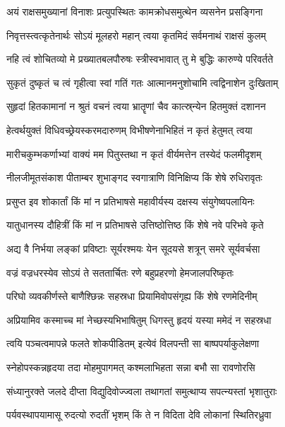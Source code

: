 \twolineshloka
{अयं राक्षसमुख्यानां विनाशः प्रत्युपस्थितः}
{कामक्रोधसमुत्थेन व्यसनेन प्रसङ्गिना} %

\twolineshloka
{निवृत्तस्त्वत्कृतेनार्थः सोऽयं मूलहरो महान्}
{त्वया कृतमिदं सर्वमनाथं राक्षसं कुलम्} %

\twolineshloka
{नहि त्वं शोचितव्यो मे प्रख्यातबलपौरुषः}
{स्त्रीस्वभावात् तु मे बुद्धिः कारुण्ये परिवर्तते} %

\twolineshloka
{सुकृतं दुष्कृतं च त्वं गृहीत्वा स्वां गतिं गतः}
{आत्मानमनुशोचामि त्वद्विनाशेन दुःखिताम्} %

\twolineshloka
{सुहृदां हितकामानां न श्रुतं वचनं त्वया}
{भ्रातॄणां चैव कात्स्र्न्येन हितमुक्तं दशानन} %

\twolineshloka
{हेत्वर्थयुक्तं विधिवच्छ्रेयस्करमदारुणम्}
{विभीषणेनाभिहितं न कृतं हेतुमत् त्वया} %

\twolineshloka
{मारीचकुम्भकर्णाभ्यां वाक्यं मम पितुस्तथा}
{न कृतं वीर्यमत्तेन तस्येदं फलमीदृशम्} %

\twolineshloka
{नीलजीमूतसंकाश पीताम्बर शुभाङ्गद}
{स्वगात्राणि विनिक्षिप्य किं शेषे रुधिरावृतः} %

\twolineshloka
{प्रसुप्त इव शोकार्तां किं मां न प्रतिभाषसे}
{महावीर्यस्य दक्षस्य संयुगेष्वपलायिनः} %

\twolineshloka
{यातुधानस्य दौहित्रीं किं मां न प्रतिभाषसे}
{उत्तिष्ठोत्तिष्ठ किं शेषे नवे परिभवे कृते} %

\twolineshloka
{अद्य वै निर्भया लङ्कां प्रविष्टाः सूर्यरश्मयः}
{येन सूदयसे शत्रून् समरे सूर्यवर्चसा} %

\twolineshloka
{वज्रं वज्रधरस्येव सोऽयं ते सततार्चितः}
{रणे बहुप्रहरणो हेमजालपरिष्कृतः} %

\twolineshloka
{परिघो व्यवकीर्णस्ते बाणैश्छिन्नः सहस्रधा}
{प्रियामिवोपसंगृह्य किं शेषे रणमेदिनीम्} %

\twolineshloka
{अप्रियामिव कस्माच्च मां नेच्छस्यभिभाषितुम्}
{धिगस्तु हृदयं यस्या ममेदं न सहस्रधा} %

\twolineshloka
{त्वयि पञ्चत्वमापन्ने फलते शोकपीडितम्}
{इत्येवं विलपन्ती सा बाष्पपर्याकुलेक्षणा} %

\twolineshloka
{स्नेहोपस्कन्नहृदया तदा मोहमुपागमत्}
{कश्मलाभिहता सन्ना बभौ सा रावणोरसि} %

\twolineshloka
{संध्यानुरक्ते जलदे दीप्ता विद्युदिवोज्ज्वला}
{तथागतां समुत्थाप्य सपत्न्यस्तां भृशातुराः} %

\twolineshloka
{पर्यवस्थापयामासू रुदत्यो रुदतीं भृशम्}
{किं ते न विदिता देवि लोकानां स्थितिरध्रुवा} %


